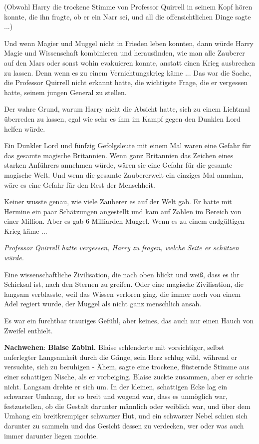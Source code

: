 (Obwohl Harry die trockene Stimme von Professor Quirrell in seinem Kopf hören
konnte, die ihn fragte, ob er ein Narr sei, und all die offensichtlichen Dinge
sagte ...)

Und wenn Magier und Muggel nicht in Frieden leben konnten, dann würde Harry
Magie und Wissenschaft kombinieren und herausfinden, wie man alle Zauberer auf
den Mars oder sonst wohin evakuieren konnte, anstatt einen Krieg ausbrechen zu
lassen. Denn wenn es zu einem Vernichtungskrieg käme ... Das war die Sache, die
Professor Quirrell nicht erkannt hatte, die wichtigste Frage, die er vergessen
hatte, seinem jungen General zu stellen.

Der wahre Grund, warum Harry nicht die Absicht hatte, sich zu einem Lichtmal
überreden zu lassen, egal wie sehr es ihm im Kampf gegen den Dunklen Lord helfen
würde.

Ein Dunkler Lord und fünfzig Gefolgsleute mit einem Mal waren eine Gefahr für
das gesamte magische Britannien. Wenn ganz Britannien das Zeichen eines starken
Anführers annehmen würde, wären sie eine Gefahr für die gesamte magische Welt.
Und wenn die gesamte Zaubererwelt ein einziges Mal annahm, wäre es eine Gefahr
für den Rest der Menschheit.

Keiner wusste genau, wie viele Zauberer es auf der Welt gab. Er hatte mit
Hermine ein paar Schätzungen angestellt und kam auf Zahlen im Bereich von einer
Million. Aber es gab 6 Milliarden Muggel. Wenn es zu einem endgültigen Krieg
käme ...

\emph{Professor Quirrell hatte vergessen, Harry zu fragen, welche Seite er
schützen würde.}

Eine wissenschaftliche Zivilisation, die nach oben blickt und weiß, dass es ihr
Schicksal ist, nach den Sternen zu greifen. Oder eine magische Zivilisation, die
langsam verblasste, weil das Wissen verloren ging, die immer noch von einem Adel
regiert wurde, der Muggel als nicht ganz menschlich ansah.

Es war ein furchtbar trauriges Gefühl, aber keines, das auch nur einen Hauch von
Zweifel enthielt.

\textbf{Nachwehen}:\textbf{ Blaise Zabini.} Blaise schlenderte mit
vorsichtiger, selbst auferlegter Langsamkeit durch die Gänge, sein Herz schlug
wild, während er versuchte, sich zu beruhigen - \glqq{}Ähem\grqq{}, sagte eine
trockene, flüsternde Stimme aus einer schattigen Nische, als er vorbeiging.
Blaise zuckte zusammen, aber er schrie nicht. Langsam drehte er sich um. In der
kleinen, schattigen Ecke lag ein schwarzer Umhang, der so breit und wogend war,
dass es unmöglich war, festzustellen, ob die Gestalt darunter männlich oder
weiblich war, und über dem Umhang ein breitkrempiger schwarzer Hut, und ein
schwarzer Nebel schien sich darunter zu sammeln und das Gesicht dessen zu
verdecken, wer oder was auch immer darunter liegen mochte.

